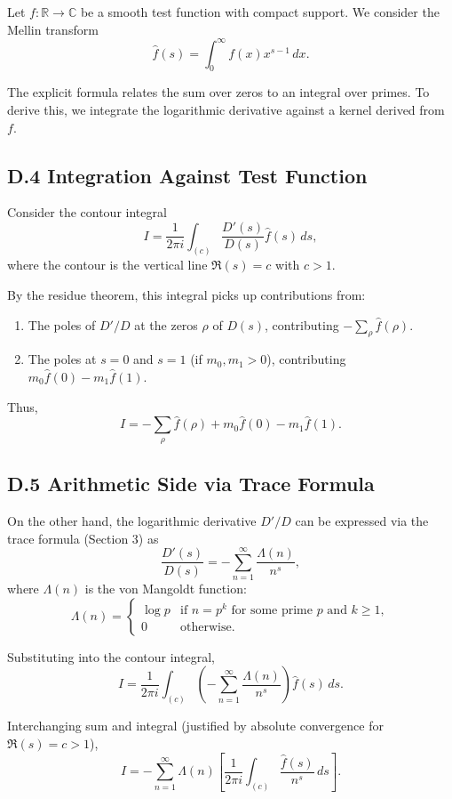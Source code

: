 Let $f: \mathbb{R} \to \mathbb{C}$ be a smooth test function with compact support. We consider the Mellin transform
\[
\hat{f}(s) = \int_0^{\infty} f(x) x^{s-1} \, dx.
\]

The explicit formula relates the sum over zeros to an integral over primes. To derive this, we integrate the logarithmic derivative against a kernel derived from $f$.

\subsection*{D.4 Integration Against Test Function}

Consider the contour integral
\[
I = \frac{1}{2\pi i} \int_{(c)} \frac{D'(s)}{D(s)} \hat{f}(s) \, ds,
\]
where the contour is the vertical line $\Re(s) = c$ with $c > 1$.

By the residue theorem, this integral picks up contributions from:
\begin{enumerate}
\item The poles of $D'/D$ at the zeros $\rho$ of $D(s)$, contributing $-\sum_\rho \hat{f}(\rho)$.
\item The poles at $s = 0$ and $s = 1$ (if $m_0, m_1 > 0$), contributing $m_0 \hat{f}(0) - m_1 \hat{f}(1)$.
\end{enumerate}

Thus,
\[
I = -\sum_{\rho} \hat{f}(\rho) + m_0 \hat{f}(0) - m_1 \hat{f}(1).
\]

\subsection*{D.5 Arithmetic Side via Trace Formula}

On the other hand, the logarithmic derivative $D'/D$ can be expressed via the trace formula (Section 3) as
\[
\frac{D'(s)}{D(s)} = -\sum_{n=1}^{\infty} \frac{\Lambda(n)}{n^s},
\]
where $\Lambda(n)$ is the von Mangoldt function:
\[
\Lambda(n) = \begin{cases}
\log p & \text{if } n = p^k \text{ for some prime } p \text{ and } k \geq 1, \\
0 & \text{otherwise}.
\end{cases}
\]

Substituting into the contour integral,
\[
I = \frac{1}{2\pi i} \int_{(c)} \left(-\sum_{n=1}^{\infty} \frac{\Lambda(n)}{n^s}\right) \hat{f}(s) \, ds.
\]

Interchanging sum and integral (justified by absolute convergence for $\Re(s) = c > 1$),
\[
I = -\sum_{n=1}^{\infty} \Lambda(n) \left[\frac{1}{2\pi i} \int_{(c)} \frac{\hat{f}(s)}{n^s} \, ds\right].
\]

